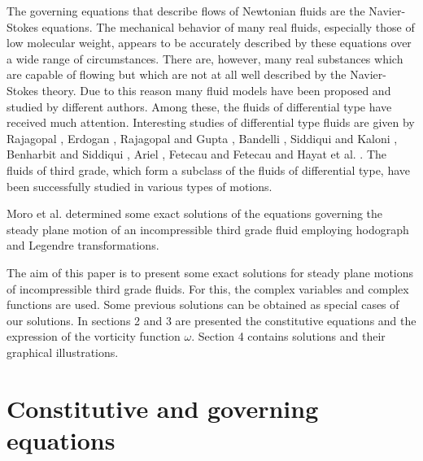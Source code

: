 \documentclass[twocolumn,showpacs,preprintnumbers,amsmath,amssymb]{revtex4}
\begin{document}
The governing equations that describe flows of Newtonian fluids are
the Navier-Stokes equations. The mechanical behavior of many real
fluids, especially those of low molecular weight, appears to be
accurately described by these equations over a wide range of
circumstances. There are, however, many real substances which are
capable of flowing but which are not at all well described by the
Navier-Stokes theory. Due to this reason many fluid models have been
proposed and studied by different authors. Among these, the fluids
of differential type have received much attention. Interesting
studies of differential type fluids are given by Rajagopal
\cite{Rajagopal1}, Erdogan \cite{Erdogan}, Rajagopal and Gupta
\cite{Gupta}, Bandelli \cite{Bandelli1}, Siddiqui and Kaloni
\cite{Siddiqui0}, Benharbit and Siddiqui \cite{Siddiqui1}, Ariel
\cite{Ariel0, Ariel1}, Fetecau and Fetecau \cite{Fetecau} and Hayat
et al. \cite{Hayat3, Hayat4, Hayat5}. The fluids of third grade,
which form a subclass of the fluids of differential type, have been
successfully studied in various types of motions.

Moro et al. \cite{Moro} determined some exact solutions of the
equations governing the steady plane motion of an incompressible
third grade fluid employing hodograph and Legendre transformations.

The aim of this paper is to present some exact solutions for steady
plane motions of incompressible third grade fluids. For this, the
complex variables and complex functions are used. Some previous
solutions can be obtained as special cases of our solutions. In
sections 2 and 3 are presented the constitutive equations and the
expression of the vorticity function $\omega.$ Section 4 contains
solutions and their graphical illustrations.

\section{\label{sec:level2}Constitutive and governing equations}
\end{document}

